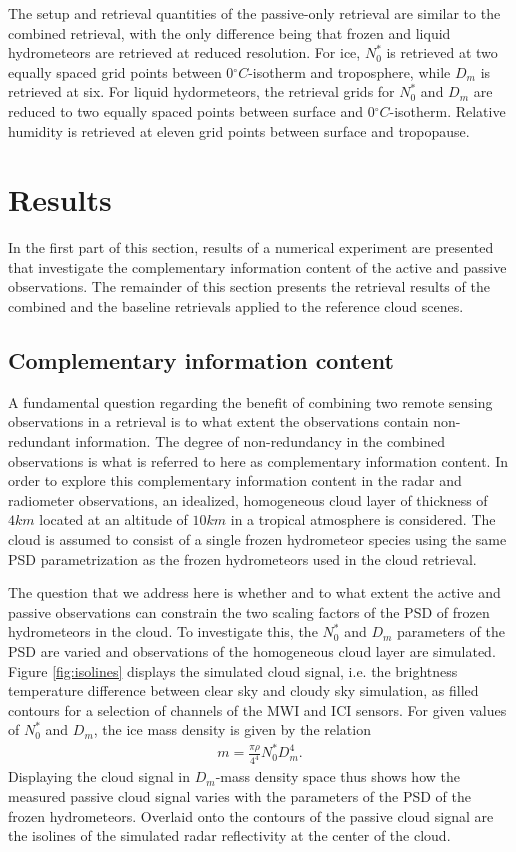 \documentclass[journal abbreviation, manuscript]{copernicus}
\begin{document}
The setup and retrieval quantities of the passive-only retrieval are similar to
the combined retrieval, with the only difference being that frozen and liquid
hydrometeors are retrieved at reduced resolution. For ice, $N_0^*$ is retrieved
at two equally spaced grid points between $0\unit{^\circ C}$-isotherm and
troposphere, while $D_m$ is retrieved at six. For liquid hydormeteors, the
retrieval grids for $N_0^*$ and $D_m$ are reduced to two equally spaced points
between surface and $0\unit{^\circ C}$-isotherm. Relative humidity is retrieved
at eleven grid points between surface and tropopause.

\section{Results}
\label{sec:results}

In the first part of this section, results of a numerical experiment are
presented that investigate the complementary information content of the active
and passive observations. The remainder of this section presents  the retrieval results
of the combined and the baseline retrievals applied to the reference cloud scenes.

\subsection{Complementary information content}
\label{sec:orgdc1b0b8}

A fundamental question regarding the benefit of combining two remote sensing
observations in a retrieval is to what extent the observations contain
non-redundant information. The degree of non-redundancy in the combined
observations is what is referred to here as complementary information content.
In order to explore this complementary information content in the radar and
radiometer observations, an idealized, homogeneous cloud layer of thickness of
$4\unit{km}$ located at an altitude of $10\unit{km}$ in a tropical atmosphere is
considered. The cloud is assumed to consist of a single frozen hydrometeor
species using the same PSD parametrization as the frozen hydrometeors used in
the cloud retrieval.

The question that we address here is whether and to what extent the active and
passive observations can constrain the two scaling factors of the PSD of frozen
hydrometeors in the cloud. To investigate this, the $N_0^*$ and $D_m$ parameters
of the PSD are varied and observations of the homogeneous cloud layer are
simulated. Figure \ref{fig:isolines} displays the simulated cloud signal, i.e.
the brightness temperature difference between clear sky and cloudy sky
simulation, as filled contours for a selection of channels of the MWI and ICI
sensors. For given values of $N_0^*$ and $D_m$, the ice mass density is given by
the relation
\begin{align}
m = \frac{\pi \rho}{4 ^ 4}N_0^* D_m^4.
\end{align}
Displaying the cloud signal in $D_m$-mass density space thus shows how the
measured passive cloud signal varies with the parameters of the PSD of the
frozen hydrometeors. Overlaid onto the contours of the passive cloud signal are
the isolines of the simulated radar reflectivity at the center of the cloud.
\end{document}
